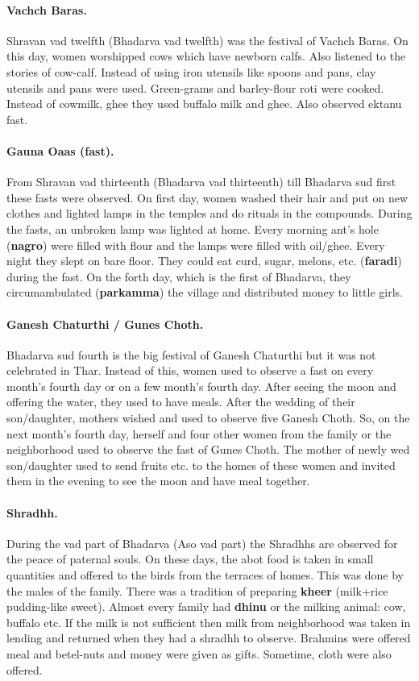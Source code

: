 \paragraph{Vachch Baras.} Shravan vad twelfth (Bhadarva vad twelfth) was the
festival of Vachch Baras. On this day, women worshipped cows which have newborn
calfs. Also listened to the stories of cow-calf. Instead of using iron utensils
like spoons and pans, clay utensils and pans were used. Green-grams and
barley-flour roti were cooked. Instead of cowmilk, ghee they used buffalo milk
and ghee. Also observed ektanu fast.
\paragraph{Gauna Oaas (fast).} From Shravan vad thirteenth (Bhadarva vad
thirteenth) till Bhadarva sud first these fasts were observed. On first day,
women washed their hair and put on new clothes and lighted lamps in the temples
and do rituals in the compounds. During the fasts, an unbroken lamp was lighted
at home. Every morning ant's hole (\textbf{nagro}) were filled with flour and
the lamps were filled with oil/ghee. Every night they slept on bare floor. They
could eat curd, sugar, melons, etc. (\textbf{faradi}) during the fast. On the
forth day, which is the first of Bhadarva, they circumambulated
(\textbf{parkamma}) the village and distributed money to little girls.
\paragraph{Ganesh Chaturthi / Gunes Choth.} Bhadarva sud fourth is the big festival of Ganesh
Chaturthi but it was not celebrated in Thar. Instead of this, women used to
observe a fast on every month's fourth day or on a few month's fourth day. After
seeing the moon and offering the water, they used to have meals. After the
wedding of their son/daughter, mothers wished and used to observe five
Ganesh Choth. So, on the next month's fourth day, herself and four other women
from the family or the neighborhood used to observe the fast of Gunes Choth. The
mother of newly wed son/daughter used to send fruits etc. to the homes of these
women and invited them in the evening to see the moon and have meal together.
\paragraph{Shradhh.} During the vad part of Bhadarva (Aso vad part) the Shradhhs
are observed for the peace of paternal souls. On these days, the abot food is
taken in small quantities and offered to the birds from the terraces of homes.
This was done by the males of the family. There was a tradition of preparing
\textbf{kheer} (milk+rice pudding-like sweet). Almost every family had
\textbf{dhinu} or the milking animal: cow, buffalo etc. If the milk is not
sufficient then milk from neighborhood was taken in lending and returned when
they had a shradhh to observe. Brahmins were offered meal and betel-nuts and
money were given as gifts. Sometime, cloth were also offered.

